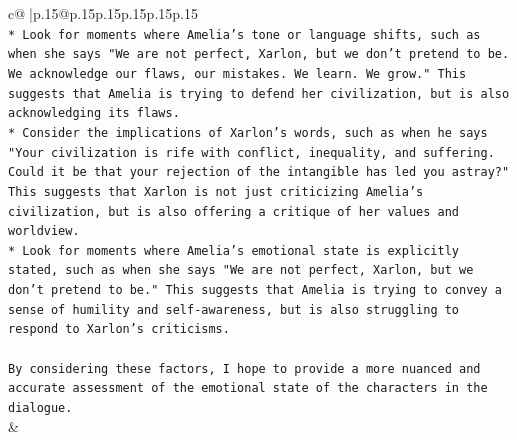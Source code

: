 \documentclass{article}
\begin{document}
{\begin{supertabular}{c@{$\;$}|p{.15\linewidth}@{}p{.15\linewidth}p{.15\linewidth}p{.15\linewidth}p{.15\linewidth}p{.15\linewidth}}
{{{\\ 
\texttt{* Look for moments where Amelia's tone or language shifts, such as when she says "We are not perfect, Xarlon, but we don't pretend to be. We acknowledge our flaws, our mistakes. We learn. We grow." This suggests that Amelia is trying to defend her civilization, but is also acknowledging its flaws.} \\
\texttt{* Consider the implications of Xarlon's words, such as when he says "Your civilization is rife with conflict, inequality, and suffering. Could it be that your rejection of the intangible has led you astray?" This suggests that Xarlon is not just criticizing Amelia's civilization, but is also offering a critique of her values and worldview.} \\
\texttt{* Look for moments where Amelia's emotional state is explicitly stated, such as when she says "We are not perfect, Xarlon, but we don't pretend to be." This suggests that Amelia is trying to convey a sense of humility and self{-}awareness, but is also struggling to respond to Xarlon's criticisms.} \\
\\ 
\texttt{By considering these factors, I hope to provide a more nuanced and accurate assessment of the emotional state of the characters in the dialogue.} \\
            }
        }
    }
    & \\ \\

\end{supertabular}
}
\end{document}
